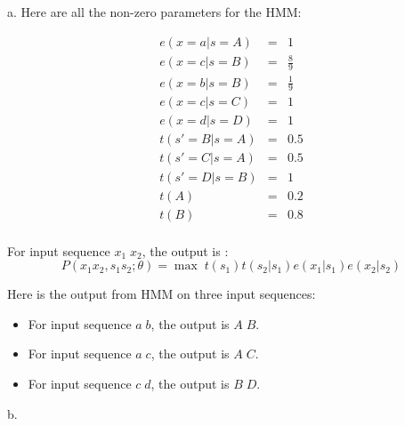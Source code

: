 \documentclass[12pt]{article}
\begin{document}
a. Here are all the non-zero parameters for the HMM:

\begin{eqnarray*}
e(x  = a | s = A) &=& 1 \\
e(x  = c | s = B) &=& \frac {8}{9} \\
e(x  = b | s = B) &=& \frac {1}{9} \\
e(x  = c | s = C) &=& 1 \\
e(x  = d | s = D) &=& 1 \\
t(s' = B | s = A) &=& 0.5 \\
t(s' = C | s = A) &=& 0.5 \\
t(s' = D | s = B) &=& 1 \\
t(A) &=& 0.2 \\
t(B) &=& 0.8 \\
\end{eqnarray*}

For input sequence $x_1 \; x_2$, the output is :
\begin{equation*}
P(x_1x_2, s_1s_2; \theta) = \max \; {t(s_1)t(s_2|s_1)e(x_1|s_1)e(x_2|s_2)}
\end{equation*}

Here is the output from HMM on three input sequences:
\begin{itemize}
\item For input sequence $a \; b$, the output is $A \; B$.
\item For input sequence $a \; c$, the output is $A \; C$.
\item For input sequence $c \; d$, the output is $B \; D$.
\end{itemize}

b. 
\end{document}
